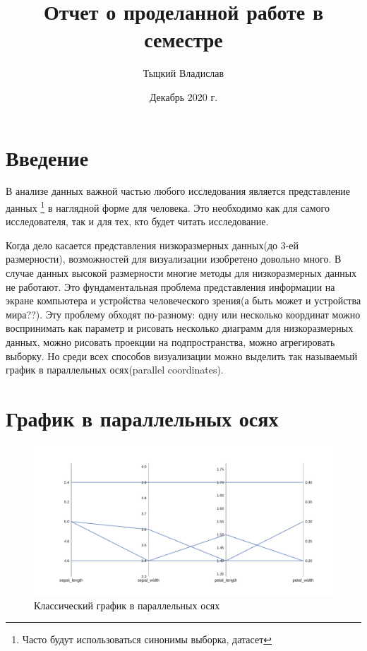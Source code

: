 \documentclass[12pt,fleqn]{article}
\title{Отчет о проделанной работе в семестре}
\author{Тыцкий Владислав}
\date{Декабрь 2020 г.}
\begin{document}
\begin{titlingpage}
    \maketitle
\end{titlingpage}

\newpage
\section{Введение}
В анализе данных важной частью любого исследования является представление данных
\footnote{Часто будут использоваться синонимы выборка, датасет}
 в наглядной форме 
для человека. Это необходимо как для самого исследователя, так и для тех, кто будет читать исследование.

Когда дело касается представления низкоразмерных данных(до 3-ей размерности),
возможностей для визуализации изобретено довольно много.
В случае данных высокой размерности многие методы
для низкоразмерных данных не работают. Это фундаментальная проблема представления информации на экране 
компьютера и устройства человеческого зрения(а быть может и устройства мира??). 
Эту проблему обходят по-разному: одну или несколько координат можно воспринимать как параметр
и рисовать несколько диаграмм для низкоразмерных данных, можно рисовать проекции на подпространства,
можно агрегировать выборку. Но среди всех способов визуализации можно выделить так называемый график в
параллельных осях(parallel coordinates).

\section{График в параллельных осях}

\begin{figure}[htb]
    \centering
    \includegraphics[width=15cm]{classic_pc.pdf}
    \caption{Классический график в параллельных осях}
    \label{classic_pc}
\end{figure}
\end{document}
